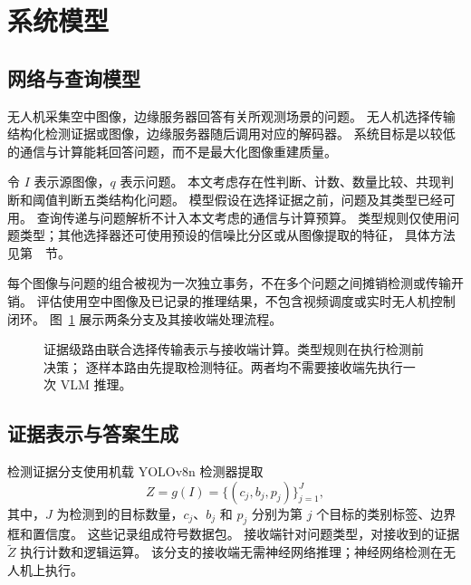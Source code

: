 \section{系统模型}\label{sec:system}

\subsection{网络与查询模型}
无人机采集空中图像，边缘服务器回答有关所观测场景的问题。
无人机选择传输结构化检测证据或图像，边缘服务器随后调用对应的解码器。
系统目标是以较低的通信与计算能耗回答问题，而不是最大化图像重建质量。

令 $I$ 表示源图像，$q$ 表示问题。
本文考虑存在性判断、计数、数量比较、共现判断和阈值判断五类结构化问题。
模型假设在选择证据之前，问题及其类型已经可用。
查询传递与问题解析不计入本文考虑的通信与计算预算。
类型规则仅使用问题类型；其他选择器还可使用预设的信噪比分区或从图像提取的特征，
具体方法见第~~节。

每个图像与问题的组合被视为一次独立事务，不在多个问题之间摊销检测或传输开销。
评估使用空中图像及已记录的推理结果，不包含视频调度或实时无人机控制闭环。
图~\ref{fig:arch} 展示两条分支及其接收端处理流程。

\begin{figure}[htbp]\centering
{}
\caption{证据级路由联合选择传输表示与接收端计算。类型规则在执行检测前决策；
逐样本路由先提取检测特征。两者均不需要接收端先执行一次 VLM 推理。}
\label{fig:arch}
\end{figure}

\subsection{证据表示与答案生成}
检测证据分支使用机载 YOLOv8n 检测器\cite{jocher2023yolov8}提取
\begin{equation}
Z=g(I)=\{(c_j,b_j,p_j)\}_{j=1}^{J},
\end{equation}
其中，$J$ 为检测到的目标数量，$c_j$、$b_j$ 和 $p_j$
分别为第 $j$ 个目标的类别标签、边界框和置信度。
这些记录组成符号数据包。
接收端针对问题类型，对接收到的证据 $\tilde Z$ 执行计数和逻辑运算。
该分支的接收端无需神经网络推理；神经网络检测在无人机上执行。

